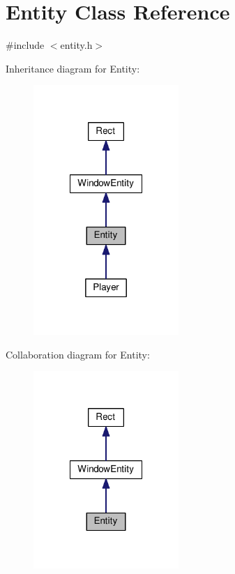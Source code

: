 \hypertarget{class_entity}{\section{Entity Class Reference}
\label{class_entity}
}


{\ttfamily \#include $<$entity.\-h$>$}



Inheritance diagram for Entity\-:\nopagebreak
\begin{figure}[H]
\begin{center}
\leavevmode
\includegraphics[width=156pt]{class_entity__inherit__graph}
\end{center}
\end{figure}


Collaboration diagram for Entity\-:\nopagebreak
\begin{figure}[H]
\begin{center}
\leavevmode
\includegraphics[width=156pt]{class_entity__coll__graph}
\end{center}
\end{figure}

